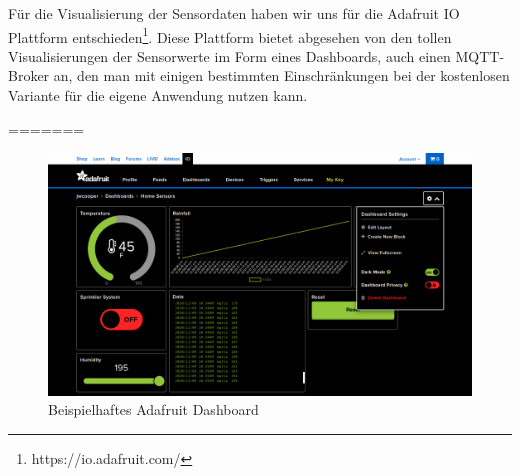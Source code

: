 Für die Visualisierung der Sensordaten haben wir uns für die Adafruit IO Plattform entschieden\footnote{https://io.adafruit.com/}. Diese Plattform bietet abgesehen von den tollen Visualisierungen der Sensorwerte im Form eines Dashboards, auch einen MQTT-Broker an, den man mit einigen bestimmten Einschränkungen bei der kostenlosen Variante für die eigene Anwendung nutzen kann. 

=======

\begin{figure}[h]
	 \centering
	 \includegraphics[width=1\textwidth]{pictures/adafruitdashboard}
	 \caption[Beispielhaftes Adafruit Dashboard]{Beispielhaftes Adafruit Dashboard\cite{adafruitdash}}
	 \label{fig:adafruitdashboard}
\end{figure}
